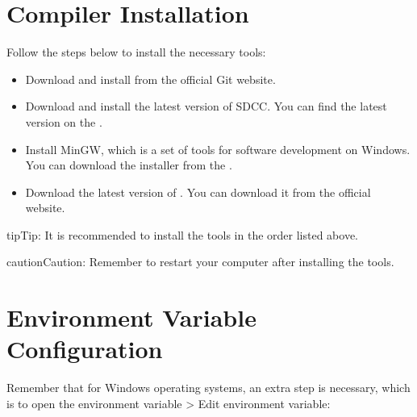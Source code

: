 \documentclass[letterpaper,10pt,english]{sphinxmanual}
\begin{document}
\section{Compiler Installation}
\label{\detokenize{install_windows:compiler-installation}}
\sphinxAtStartPar
Follow the steps below to install the necessary tools:
\begin{itemize}
\item {} 
\sphinxAtStartPar
{}
Download and install  from the official Git website.

\item {} 
\sphinxAtStartPar
{}
Download and install the latest version of SDCC. You can find the latest version on the .

\item {} 
\sphinxAtStartPar
{}
Install MinGW, which is a set of tools for software development on Windows. You can download the installer from the .

\item {} 
\sphinxAtStartPar
{}
Download the latest version of . You can download it from the official website.

\end{itemize}

\begin{sphinxadmonition}{tip}{Tip:}
\sphinxAtStartPar
It is recommended to install the tools in the order listed above.
\end{sphinxadmonition}

\begin{sphinxadmonition}{caution}{Caution:}
\sphinxAtStartPar
Remember to restart your computer after installing the tools.
\end{sphinxadmonition}


\section{Environment Variable Configuration}
\label{\detokenize{install_windows:environment-variable-configuration}}
\sphinxAtStartPar
Remember that for Windows operating systems, an extra step is necessary, which is to open the environment variable \sphinxhyphen{}\textgreater{} Edit environment variable:
\end{document}
